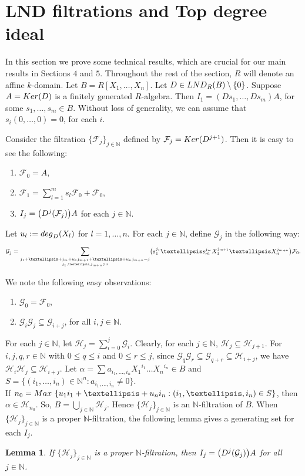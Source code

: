 \documentclass[a4paper,12pt]{article}
\newtheorem{lem}[thm]{Lemma}
\newcommand{\bN}{\mathbb N}
\newcommand{\lF}{\mathcal{F}}
\newcommand{\lG}{\mathcal{G}}
\newcommand{\lH}{\mathcal{H}}
\begin{document}
{\section{LND filtrations and Top degree ideal}
In this section we prove some technical results, which are crucial for our main results in Sections $4$ and $5$. Throughout the rest of the section, $R$ will denote an affine $k$-domain. Let $B=R[X_1,\dots,X_n]$. 
Let $D\in{\rm LND}_R(B)\setminus\{0\}$. Suppose $A={\rm Ker}(D)$ is a finitely generated $R$-algebra. Then $I_1=(Ds_1,\dots,Ds_m)A$, for some $s_1,\dots,s_m\in B$. Without loss of generality, we can assume that $s_i(0,\dots,0)=0$, for each $i$.

\smallskip\noindent
Consider the filtration $\{\mathcal{F}_j\}_{j\in{\bN }}$ defined by
$\mathcal{F}_j={\rm Ker}(D^{j+1})$. Then it is easy to see the following:
\begin{enumerate}
\item[\rm(i)] $\mathcal{F}_0=A$,
\item[\rm(ii)] $\mathcal{F}_1=\sum_{l=1}^{m}s_l\mathcal{F}_0+\mathcal{F}_0$,
\item[\rm(iii)] $I_j=\big{(}D^j(\mathcal {F}_j)\big{)} A$ for each $j\in\bN$. 

\end{enumerate}

\noindent 
Let $u_l:={\rm deg}_D(X_l)$ for $l=1,\dots,n.$ For each $j\in\bN$, define $\mathcal{G}_j$ in the following way:
$$\mathcal{G}_j=\underset{\underset{j_1,\dots,j_{m+n}\geqslant 0}{j_1+\dots+j_m+u_1j_{m+1}+\dots+u_nj_{m+n}=j}}{\text{\Large $\sum$}}\big{(}s_1^{j_1}\dots s_m^{j_m}X_1^{j_{m+1}}\dots X_n^{j_{m+n}}\big{)}\lF_0.$$


\noindent
We note the following easy observations:
\begin{enumerate}
\item[\rm(i)] $\lG_0=\lF_0$,
\item[\rm(ii)] $\lG_i\lG_j\subseteq\lG_{i+j}$, for all $i,j\in\bN$.
\end{enumerate}

\noindent
For each $j\in\bN$, let
$\mathcal{H}_j=\sum_{i=0}^j\mathcal{G}_i$. Clearly, for each $j\in\bN$, $\lH_j\subseteq\lH_{j+1}$. For $i,j,q,r\in\bN$ with $0\leqslant q\leqslant i$ and $0\leqslant r\leqslant j$, since $\lG_q\lG_r\subseteq\lG_{q+r}\subseteq{\lH_{i+j}}$, we have $\lH_i\lH_j\subseteq\lH_{i+j}$.
Let $\alpha=\sum a_{i_1,\dots,i_n}{X_1}^{i_1}\dots{X_n}^{i_n}\in{B}$ and $S=\{(i_1,\dots,i_n)\in{\bN}^n:a_{i_1,\dots,i_n}\neq 0\}$.\\ If $n_0={\rm Max}~\{u_1i_1+\dots+u_ni_n:(i_1,\dots,i_n)\in S\}$, then $\alpha \in\lH_{n_0}$. So, $B=\bigcup_{j\in\bN}\lH_j$. Hence $\{\lH_j\}_{j\in\bN}$ is an $\bN$-filtration of $B$. When $\{\lH_j\}_{j\in\bN}$ is a proper $\bN$-filtration, the following lemma gives a generating set for each $I_j$.
\begin{lem}\label{jth image ideal}
If $\{\lH_j\}_{j\in\bN}$ is a proper $\bN$-filtration, then $I_j=\big{(} D^j(\mathcal{G}_j)\big{)}A$ for all $j\in{\bN}$.
\end{lem}

}
\end{document}
